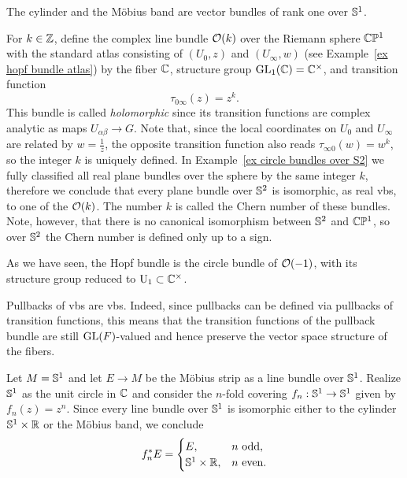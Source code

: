 \begin{example}
The cylinder and the M\"obius band are vector bundles of rank one over $\mathbb{S}^1$.
\end{example}

\begin{example}\label{ex holomorphic bundle O(k)}
    For $k\in\mathbb{Z}$, define the complex line bundle $\mathcal{O}(k)$ over the Riemann sphere $\mathbb{C}\mathbb{P}^1$ with the standard atlas consisting of $(U_0,z)$ and $(U_\infty,w)$ (see Example~\ref{ex hopf bundle atlas}) by the fiber $\mathbb{C}$, structure group $\operatorname{GL}_1(\mathbb{C})=\mathbb{C}^\times$, and transition function
    \[\tau_{0\infty}(z)=z^k.\]
    This bundle is called \emph{holomorphic} since its transition functions are complex analytic as maps $U_{\alpha\beta}\to G$.
    Note that, since the local coordinates on $U_0$ and $U_\infty$ are related by $w=\frac{1}{z}$, the opposite transition function also reads $\tau_{\infty 0}(w)=w^k$, so the integer $k$ is uniquely defined. In Example~\ref{ex circle bundles over S2} we fully classified all real plane bundles over the sphere by the same integer $k$, therefore we conclude that every plane bundle over $\mathbb{S}^2$ is isomorphic, as real \glspl{vb}, to one of the $\mathcal{O}(k)$. The number $k$ is called the Chern number of these bundles. Note, however, that there is no canonical isomorphism between $\mathbb{S}^2$ and $\mathbb{C}\mathbb{P}^1$, so over $\mathbb{S}^2$ the Chern number is defined only up to a sign.
    
    As we have seen, the Hopf bundle is the circle bundle of $\mathcal{O}(-1)$, with its structure group reduced to $\operatorname{U}_1\subset \mathbb{C}^\times$.
\end{example}


\begin{rem}
    Pullbacks of \glspl{vb} are \glspl{vb}. Indeed, since pullbacks can be defined via pullbacks of transition functions, this means that the transition functions of the pullback bundle are still $\operatorname{GL}(F)$-valued and hence preserve the vector space structure of the fibers.
\end{rem}


\begin{example}
    Let $M=\mathbb{S}^1$ and let $E\to M$ be the M\"obius strip as a line bundle over $\mathbb{S}^1$. Realize $\mathbb{S}^1$ as the unit circle in $\mathbb{C}$ and consider the $n$-fold covering $f_n:\mathbb{S}^1\to \mathbb{S}^1$ given by $f_n(z)=z^n$. Since every line bundle over $\mathbb{S}^1$ is isomorphic either to the cylinder $\mathbb{S}^1\times \mathbb{R}$ or the M\"obius band, we conclude
    \[f_n^\ast E=\begin{cases}
        E,& n\text{ odd},\\
        \mathbb{S}^1\times\mathbb{R},& n\text{ even}.
    \end{cases}\]
\end{example}



